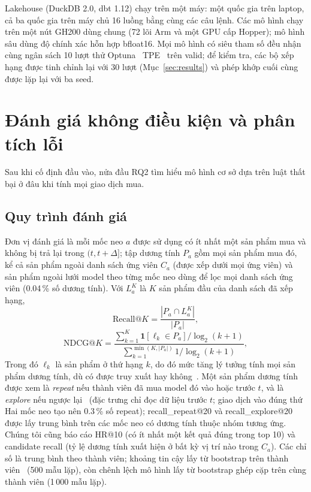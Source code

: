 \documentclass[jtehm]{ieeeaccess}
\begin{document}
Lakehouse (DuckDB 2.0, dbt 1.12) chạy trên một máy: một quốc gia trên laptop, cả ba quốc gia trên máy chủ 16 luồng bằng cùng các câu lệnh. Các mô hình chạy trên một nút GH200 dùng chung (72 lõi Arm và một GPU cấp Hopper); mô hình sâu dùng độ chính xác hỗn hợp bfloat16. Mọi mô hình có siêu tham số đều nhận cùng ngân sách 10 lượt thử Optuna~\cite{akiba2019optuna} TPE~\cite{bergstra2011tpe} trên valid; để kiểm tra, các bộ xếp hạng được tinh chỉnh lại với 30 lượt (Mục~\ref{sec:results}) và phép khớp cuối cùng được lặp lại với ba seed.

\section{Đánh giá không điều kiện và phân tích lỗi}
\label{sec:protocol}

Sau khi cố định đầu vào, nửa đầu RQ2 tìm hiểu mô hình cơ sở dựa trên luật thất bại ở đâu khi tính mọi giao dịch mua.

\subsection{Quy trình đánh giá}
Đơn vị đánh giá là mỗi mốc neo $a$ được sử dụng có ít nhất một sản phẩm mua và không bị trả lại trong $(t, t+\Delta]$; tập dương tính $P_a$ gồm mọi sản phẩm mua đó, kể cả sản phẩm ngoài danh sách ứng viên $C_a$ (được xếp dưới mọi ứng viên) và sản phẩm ngoài lưới model theo từng mốc neo dùng để lọc mọi danh sách ứng viên (0.04\,\% số dương tính). Với $L_a^K$ là $K$ sản phẩm đầu của danh sách đã xếp hạng,
\begin{equation}
\mathrm{Recall}@K = \frac{|P_a \cap L_a^K|}{|P_a|},
\end{equation}
\begin{equation}
\mathrm{NDCG}@K = \frac{\sum_{k=1}^{K} \mathbf{1}[\ell_k \in P_a] / \log_2(k+1)}{\sum_{k=1}^{\min(K, |P_a|)} 1/\log_2(k+1)},
\end{equation}
Trong đó $\ell_k$ là sản phẩm ở thứ hạng $k$, do đó mức tăng lý tưởng tính mọi sản phẩm dương tính, dù có được truy xuất hay không~\cite{jarvelin2002ndcg}. Một sản phẩm dương tính được xem là \emph{repeat} nếu thành viên đã mua model đó vào hoặc trước $t$, và là \emph{explore} nếu ngược lại~\cite{li2023nbr} (đặc trưng chỉ đọc dữ liệu trước $t$; giao dịch vào đúng thứ Hai mốc neo tạo nên 0.3\,\% số repeat); recall\_repeat@20 và recall\_explore@20 được lấy trung bình trên các mốc neo có dương tính thuộc nhóm tương ứng. Chúng tôi cũng báo cáo HR@10 (có ít nhất một kết quả đúng trong top 10) và candidate recall (tỷ lệ dương tính xuất hiện ở bất kỳ vị trí nào trong $C_a$). Các chỉ số là trung bình theo thành viên; khoảng tin cậy lấy từ bootstrap trên thành viên~\cite{efron1993bootstrap} (500 mẫu lặp), còn chênh lệch mô hình lấy từ bootstrap ghép cặp trên cùng thành viên (1\,000 mẫu lặp).
\end{document}
